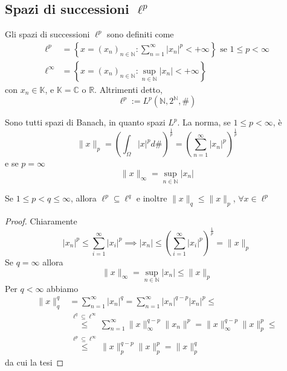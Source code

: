 \subsection{Spazi di successioni \(\ell^{p}\) }
\begin{definition}
    Gli spazi di successioni \(\ell^{p}\) sono definiti come
    \begin{align*}
        \ell^{p} &= \left\{x = {(x_{n})}_{n \in \mathbb{N}} : \sum_{n=1}^{\infty}
        |x_{n}|^{p} < +\infty \right\} \text{ se } 1 \le p < \infty \\
            \ell^{\infty} &= \left\{x = {(x_{n})}_{n \in \mathbb{N}} : \sup_{n \in
        \mathbb{N}} |x_{n}| < +\infty\right\} 
    \end{align*}
    con \(x_{n} \in \mathbb{K}\), e \(\mathbb{K}= \mathbb{C}\) o \(\mathbb{R}\).
    Altrimenti detto, 
    \[
        \ell^{p} := L^{p}{\left( \mathbb{N}, 2^{\mathbb{N}}, \# \right)} 
    \]
\end{definition}
Sono tutti spazi di Banach, in quanto spazi \(L^{p}\). La norma, se \(1 \le p <
\infty\), è
\[
    \|x\|_p = {\left( \int_{\Omega} |x|^{p} d\#  \right)} ^{\frac{1}{p}} =
    {\left( \sum_{n=1}^{\infty} |x_{n}|^{p}  \right)} ^{\frac{1}{p}} 
\]
e se \(p = \infty\) 
\[
    \|x\|_{\infty} = \sup_{n \in \mathbb{N}} |x_{n}|
\]
\begin{proposition}
    Se \(1 \le p < q \le \infty\), allora \(\ell^{p} \subseteq \ell^{q}\) e
    inoltre \(\|x\|_q \le \|x\|_p\), \(\forall x \in \ell^{p}\) 
\end{proposition}
\begin{proof}
    Chiaramente
    \[
       |x_{n}|^{p} \le \sum_{i=1}^{\infty} |x_{i}|^{p} \implies |x_{n}| \le
       {\left( \sum_{i=1}^{\infty} |x_{i}|^{p}  \right)}^{\frac{1}{p}} = \|x\|_p
    \]
    Se \(q = \infty\) allora 
    \[
        \|x\|_{\infty} = \sup_{n \in \mathbb{N}} |x_{n}| \le \|x\|_p
    \]
    Per \(q < \infty\) abbiamo
    \begin{align*}
        \|x\|_q^{q} &= \sum_{n=1}^{\infty} |x_{n}|^{q} = \sum_{n=1}^{\infty}
        |x_{n}|^{q-p}|x_{n}|^{p} \le \\ &\overset{\ell^{q} \subseteq \ell^{\infty} }{\le
        } \sum_{n=1}^{\infty} \|x\|_{\infty} ^{q-p} \|x_n\|^p = \|x\|_{\infty} ^{q-p}
        \|x\|_p^{p} \le \\
        &\overset{\ell^{p} \subseteq\ell^{\infty} }{\le } \|x\|_{p} ^{q-p} 
        \|x\|^{p}_p = \|x\|_p^{q} 
    \end{align*}
    da cui la tesi
\end{proof}
